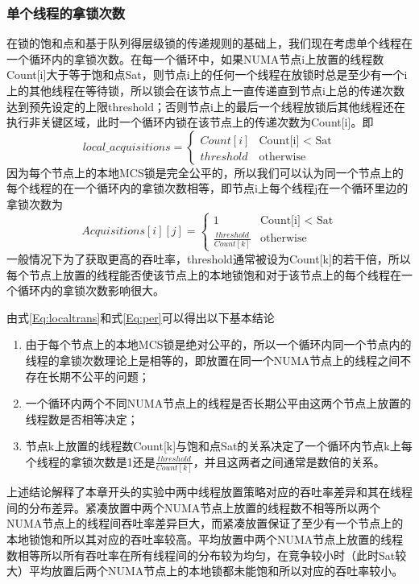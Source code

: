 \subsubsection{单个线程的拿锁次数}
在锁的饱和点和基于队列得层级锁的传递规则的基础上，我们现在考虑单个线程在一个循环内的拿锁次数。在每一个循环中，如果NUMA节点i上放置的线程数Count[i]大于等于饱和点Sat，则节点i上的任何一个线程在放锁时总是至少有一个i上的其他线程在等待锁，所以锁会在该节点上一直传递直到节点i上总的传递次数达到预先设定的上限threshold；否则节点i上的最后一个线程放锁后其他线程还在执行非关键区域，此时一个循环内锁在该节点上的传递次数为Count[i]。即
\begin{equation}\label{Eq:localtrans}
local\_acquisitions =
\begin{cases}
Count[i] &\text{Count[i] < Sat}\\
threshold &\text{otherwise}
\end{cases}
\end{equation}
因为每个节点上的本地MCS锁是完全公平的，所以我们可以认为同一个节点上的每个线程的在一个循环内的拿锁次数相等，即节点i上每个线程j在一个循环里边的拿锁次数为
\begin{equation}\label{Eq:per}
Acquisitions[i][j] =
\begin{cases}
1 &\text{Count[i] < Sat}\\
\frac{threshold}{Count[k]} &\text{otherwise}
\end{cases}
\end{equation}
一般情况下为了获取更高的吞吐率，threshold通常被设为Count[k]的若干倍，所以每个节点上放置的线程能否使该节点上的本地锁饱和对于该节点上的每个线程在一个循环内的拿锁次数影响很大。

由式\ref{Eq:localtrans}和式\ref{Eq:per}可以得出以下基本结论
\begin{enumerate}
    \item 由于每个节点上的本地MCS锁是绝对公平的，所以一个循环内同一个节点内的线程的拿锁次数理论上是相等的，即放置在同一个NUMA节点上的线程之间不存在长期不公平的问题；
    \item 一个循环内两个不同NUMA节点上的线程是否长期公平由这两个节点上放置的线程数是否相等决定；
    \item 节点k上放置的线程数Count[k]与饱和点Sat的关系决定了一个循环内节点k上每个线程的拿锁次数是1还是$\frac{threshold}{Count[k]}$，并且这两者之间通常是数倍的关系。
\end{enumerate}
上述结论解释了本章开头的实验中两中线程放置策略对应的吞吐率差异和其在线程间的分布差异。紧凑放置中两个NUMA节点上放置的线程数不相等所以两个NUMA节点上的线程间吞吐率差异巨大，而紧凑放置保证了至少有一个节点上的本地锁饱和所以其对应的吞吐率较高。平均放置中两个NUMA节点上放置的线程数相等所以所有吞吐率在所有线程间的分布较为均匀，在竞争较小时（此时Sat较大）平均放置后两个NUMA节点上的本地锁都未能饱和所以对应的吞吐率较小。

